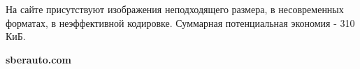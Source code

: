 \noindent
\begin{minipage}{\linewidth}
\end{minipage}
\bigskip

На сайте присутствуют изображения неподходящего размера, в несовременных форматах, в неэффективной кодировке. Суммарная потенциальная экономия - 310 КиБ.

\textbf{sberauto.com}
\bigskip

\noindent
\begin{minipage}{\linewidth}
\end{minipage}
\bigskip

